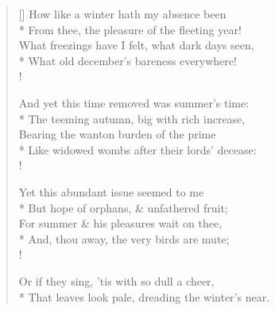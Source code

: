 \documentclass[MAIN]{subfiles}
\begin{document}
\settowidth{\versewidth}{\vin From thee, the pleasure of the fleeting year!}
\begin{verse}[\versewidth]
How like a winter hath my absence been\\*
\vin From thee, the pleasure of the fleeting year!\\
What freezings have I felt, what dark days seen,\\*
\vin What old december's bareness everywhere!\\!

And yet this time removed was summer's time:\\*
\vin The teeming autumn, big with rich increase,\\
Bearing the wanton burden of the prime\\*
\vin Like widowed wombs after their lords' decease:\\!

Yet this abundant issue seemed to me\\*
\vin But hope of orphans, \& unfathered fruit;\\
For summer \& his pleasures wait on thee,\\*
\vin And, thou away, the very birds are mute;\\!

Or if they sing, 'tis with so dull a cheer,\\*
That leaves look pale, dreading the winter's near.
\end{verse}
\end{document}
